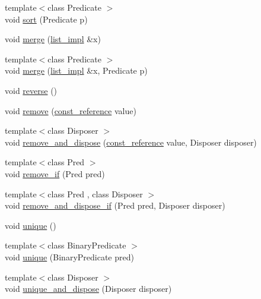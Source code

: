 \begin{DoxyCompactItemize}
\item 
{\footnotesize template$<$class Predicate $>$ }\\void \hyperlink{classboost_1_1intrusive_1_1list__impl_a76891ada0d200ee89011b08ce5d548c0}{sort} (Predicate p)
\item 
void \hyperlink{classboost_1_1intrusive_1_1list__impl_abb9a2b93c0b84ec5dbf23df2c3ff3dcf}{merge} (\hyperlink{classboost_1_1intrusive_1_1list__impl}{list\+\_\+impl} \&x)
\item 
{\footnotesize template$<$class Predicate $>$ }\\void \hyperlink{classboost_1_1intrusive_1_1list__impl_acae4748c2c7891009cafd2b2a1adc057}{merge} (\hyperlink{classboost_1_1intrusive_1_1list__impl}{list\+\_\+impl} \&x, Predicate p)
\item 
void \hyperlink{classboost_1_1intrusive_1_1list__impl_a09ad4e2d3e2561d0cfe1be3ab7601b9c}{reverse} ()
\item 
void \hyperlink{classboost_1_1intrusive_1_1list__impl_a67b3e202dc68b3de5643c2abf40847f7}{remove} (\hyperlink{classboost_1_1intrusive_1_1list__impl_a3d37629151c76fb8389ac3ba3b359201}{const\+\_\+reference} value)
\item 
{\footnotesize template$<$class Disposer $>$ }\\void \hyperlink{classboost_1_1intrusive_1_1list__impl_ab52f7ab80a51b6364f950a3e7521018b}{remove\+\_\+and\+\_\+dispose} (\hyperlink{classboost_1_1intrusive_1_1list__impl_a3d37629151c76fb8389ac3ba3b359201}{const\+\_\+reference} value, Disposer disposer)
\item 
{\footnotesize template$<$class Pred $>$ }\\void \hyperlink{classboost_1_1intrusive_1_1list__impl_ab74f15b0c56ff811322551eb7090be2d}{remove\+\_\+if} (Pred pred)
\item 
{\footnotesize template$<$class Pred , class Disposer $>$ }\\void \hyperlink{classboost_1_1intrusive_1_1list__impl_afb94638a081eb6fed0bf005b04cf9f88}{remove\+\_\+and\+\_\+dispose\+\_\+if} (Pred pred, Disposer disposer)
\item 
void \hyperlink{classboost_1_1intrusive_1_1list__impl_a9c7d8dd6a59be1e0c73eb19d1a6d0a50}{unique} ()
\item 
{\footnotesize template$<$class Binary\+Predicate $>$ }\\void \hyperlink{classboost_1_1intrusive_1_1list__impl_a2d237761bc8d589a706731a9e1b2da2f}{unique} (Binary\+Predicate pred)
\item 
{\footnotesize template$<$class Disposer $>$ }\\void \hyperlink{classboost_1_1intrusive_1_1list__impl_a782aa8957c448e81553e803349b5f159}{unique\+\_\+and\+\_\+dispose} (Disposer disposer)

\end{DoxyCompactItemize}
